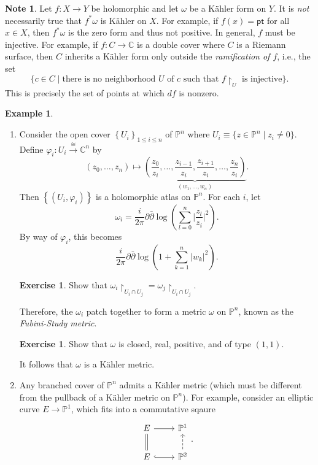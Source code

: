 \documentclass[10pt,letterpaper,cm]{nupset}
\theoremstyle{definition}
\newtheorem{exmp}[defn]{Example}
\newtheorem{note}[defn]{Note}
\theoremstyle{theorem}
\newtheorem{exercise}[defn]{Exercise}
\theoremstyle{remark}
\newcommand{\C}{\mathbb C}
\renewcommand{\P}{\mathbb P}
\newcommand{\1}{\mathbb{1}}
\newcommand{\0}{\vec 0}
\newcommand{\pt}{\mathsf{pt}}
\newcommand{\be}{\begin{enumerate}}
\newcommand{\ee}{\end{enumerate}}
\begin{document}
\begin{note}
Let $f: X \to Y$ be holomorphic and let $\omega$ be a K\"ahler form on $Y$. It is \emph{not} necessarily true that $f^{\ast}{\omega}$ is K\"ahler on $X$. For example, if $f(x) = \pt$ for all $x\in X$, then $f^{\ast}{\omega}$ is the zero form and thus not positive. 
In general,  $f$ must be injective. For example, if $f: C \to \C$ is a double cover where $C$ is a Riemann surface, then $C$ inherits a K\"ahler form only outside the  \textit{ramification of $f$}, i.e., the set $$\{c\in C \mid \text{there is no neighborhood } U \text{ of  } c \text{ such that } f\restriction_U \text{ is injective}\}.$$ This is precisely the set of points at which $d{f}$ is nonzero.
\end{note}

\begin{exmp}\label{km2} $ $
\be
\item  Consider the open cover $\left\{U_i\right\}_{1\leq i \leq n}$ of $\P^n$ where $U_i \equiv \{z \in \P^n \mid z_i \ne 0\}$. Define $\varphi_i : U_i \overset{\cong}{\longrightarrow} \C^n$ by $$\left(z_0, \ldots, z_n\right) \mapsto \underbrace{\left(\frac{z_0}{z_i}, \ldots, \frac{z_{i-1}}{z_i}, \frac{z_{i+1}}{z_i}, \ldots, \frac{z_n}{z_i}\right)}_{\left(w_1, \ldots, w_n\right)}. $$ Then $\left\{\left(U_i, \varphi_i\right)\right\}$ is a holomorphic atlas on $\P^n$. For each $i$, let 
\[
\omega_i =  \frac{i}{2\pi}{\partial{\bar{\partial}}\log\left(\sum_{l=0}^n \lvert{\frac{z_l}{z_i}}\rvert^2\right)}
.\] By way of $\varphi_i$, this becomes
\[
\frac{i}{2\pi}{\partial{\bar{\partial}}\log\left(1+ \sum_{k=1}^n \lvert{w_k}\rvert^2\right)}
.\]
\begin{exercise}
 Show that $\omega_i\restriction_{U_i \cap U_j} = \omega_j\restriction_{U_i \cap U_j}$.
\end{exercise}
Therefore, the $\omega_i$ patch together to form a metric $\omega$ on $\P^n$, known as the \textit{Fubini-Study metric}. 
\begin{exercise}
Show that $\omega$ is closed, real, positive, and of type $\left(1,1\right)$.
\end{exercise}
It follows that $\omega$ is a K\"ahler metric.

\item  Any branched cover of $\P^n$ admits a K\"ahler metric (which must be different from the pullback of a K\"ahler metric on $\P^n$). For example, consider an elliptic curve $E \to \P^1$, which fits into a commutative sqaure
\[
\begin{tikzcd}
E \arrow[d, equals] \arrow[r] & \P^1                   \\
E \arrow[r, hook]     & \P^2 \arrow[u, dashed]
\end{tikzcd}
.\]
\ee
\end{exmp}
\end{document}
